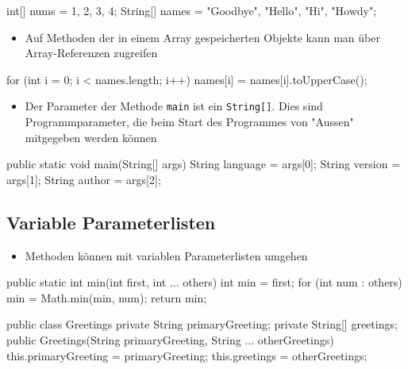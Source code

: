 \documentclass[a4paper,10pt, dvipsnames]{report}
\newcommand{\javaInLine}[1]{\texttt{#1}}
\begin{document}
\begin{javacodebox}
    int[] nums = {1, 2, 3, 4};
    String[] names = {"Goodbye", "Hello", "Hi", "Howdy"};
\end{javacodebox}


\begin{itemize}
	\item Auf Methoden der in einem Array gespeicherten Objekte kann man über Array-Referenzen zugreifen
\end{itemize}

\begin{javacodebox}
    for (int i = 0; i < names.length; i++)
        names[i] = names[i].toUpperCase();
\end{javacodebox}


\begin{itemize}
	\item Der Parameter der Methode \javaInLine{main} ist ein \javaInLine{String[]}. Dies sind Programmparameter, die beim Start des Programmes von "Aussen" mitgegeben werden können
\end{itemize}

\begin{javacodebox}
    public static void main(String[] args) {
        String language = args[0];
        String version = args[1];
        String author = args[2];
    }
\end{javacodebox}

\subsection{Variable Parameterlisten}

\begin{itemize}
    \item Methoden können mit variablen Parameterlisten umgehen
\end{itemize}

\begin{javacodebox}
    public static int min(int first, int ... others) {
        int min = first;
        for (int num : others)
            min = Math.min(min, num);
        return min;
    }
\end{javacodebox}

\begin{javacodebox}
    public class Greetings {
        private String primaryGreeting;
        private String[] greetings;
        public Greetings(String primaryGreeting, String ... otherGreetings) {
            this.primaryGreeting = primaryGreeting;
            this.greetings = otherGreetings;
        }
    }
\end{javacodebox}
\end{document}
